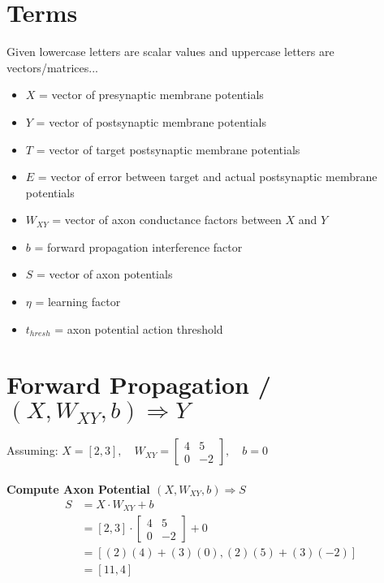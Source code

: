 \documentclass[12 pt]{article}
\begin{document}
\thispagestyle{empty}
\section*{Terms}

	Given lowercase letters are scalar values and uppercase letters are vectors/matrices...
	\begin{itemize}
		\item $X$ = vector of presynaptic membrane potentials
		\item $Y$ = vector of postsynaptic membrane potentials
		\item $T$ = vector of target postsynaptic membrane potentials
		\item $E$ = vector of error between target and actual postsynaptic membrane potentials
		\item $W_{XY}$ = vector of axon conductance factors between $X$ and $Y$
		\item $b$ = forward propagation interference factor
		\item $S$ = vector of axon potentials
		\item $\eta$ = learning factor
		\item $t_{hresh}$ = axon potential action threshold
	\end{itemize}

\newpage\thispagestyle{empty}
\section*{Forward Propagation / $(X, W_{XY}, b) \Rightarrow Y$}

	Assuming:
		$
			X = [2, 3],
			\quad W_{XY} = \begin{bmatrix}4 & 5\\0 & -2\end{bmatrix},
			\quad b = 0
		$\\\\

	\textbf{Compute Axon Potential $(X, W_{XY}, b) \Rightarrow S$}
	\begin{align*}
		S &= X \cdot W_{XY} + b\\
		&= [2, 3] \cdot \begin{bmatrix}4 & 5\\0 & -2\end{bmatrix} + 0\\
		&= [(2)(4) + (3)(0), (2)(5) + (3)(-2)]\\
		&= [11, 4]
	\end{align*}
\end{document}
